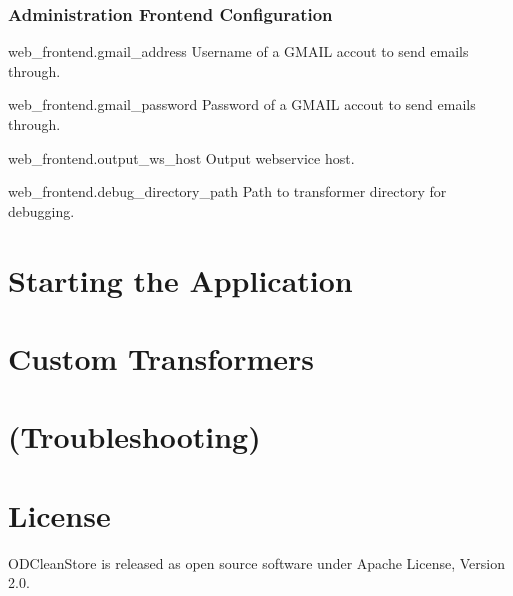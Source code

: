 \subsection*{Administration Frontend Configuration}
\begin{configlist}
	
	\item[web\_frontend.gmail\_address]
		Username of a GMAIL accout to send emails through.
		
	\item[web\_frontend.gmail\_password]
		Password of a GMAIL accout to send emails through.
		
	\item[web\_frontend.output\_ws\_host]
		Output webservice host.
		
	\item[web\_frontend.debug\_directory\_path]
		Path to transformer directory for debugging.
\end{configlist}


\chapter{Starting the Application}


\chapter{Custom Transformers}

\chapter{(Troubleshooting)}



\appendix

\chapter{License}
ODCleanStore is released as open source software under Apache License, Version 2.0.

